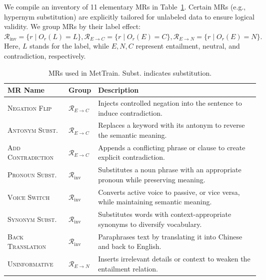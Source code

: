 \documentclass[lettersize,journal]{IEEEtran}
\begin{document}

We compile an inventory of 11 elementary MRs in Table~\ref{tab:allMRs}. Certain MRs (e.g., hypernym substitution) are explicitly tailored for unlabeled data to ensure logical validity. 
We group MRs by their label effect:
\(
\mathcal{R}_{\mathrm{inv}}=\{r \mid O_r(L)=L\}, 
\mathcal{R}_{E\rightarrow C}=\{r \mid O_r(E)=C\}, 
\mathcal{R}_{E\rightarrow N}=\{r \mid O_r(E)=N\}.
\)
Here, $L$ stands for the label, while $E,N,C$ represent entailment, neutral, and contradiction, respectively.

\begin{table}[h]
	\centering
	\footnotesize
	\caption{MRs used in MetTrain. Subst. indicates substitution.}
	\label{tab:allMRs}
	\renewcommand{\arraystretch}{0.95}
	\setlength{\tabcolsep}{3pt}
	\begin{tabularx}{\columnwidth}{>{\raggedright\arraybackslash}p{}
			>{\centering\arraybackslash}p{}
			>{\raggedright\arraybackslash}X}
		\toprule
		\textbf{MR Name} & \textbf{Group} & \textbf{Description} \\
		\midrule
		\textsc{Negation Flip} & $\mathcal{R}_{E\rightarrow C}$ & Injects controlled negation into the sentence to induce contradiction. \\
		\textsc{Antonym Subst.} & $\mathcal{R}_{E\rightarrow C}$ & Replaces a keyword with its antonym to reverse the semantic meaning. \\
		\textsc{Add Contradiction} & $\mathcal{R}_{E\rightarrow C}$ & Appends a conflicting phrase or clause to create explicit contradiction. \\
		\textsc{Pronoun Subst.} & $\mathcal{R}_{\mathrm{inv}}$ & Substitutes a noun phrase with an appropriate pronoun while preserving meaning. \\
		\textsc{Voice Switch} & $\mathcal{R}_{\mathrm{inv}}$ & Converts active voice to passive, or vice versa, while maintaining semantic meaning. \\
		\textsc{Synonym Subst.} & $\mathcal{R}_{\mathrm{inv}}$ & Substitutes words with context-appropriate synonyms to diversify vocabulary. \\
		\textsc{Back Translation} & $\mathcal{R}_{\mathrm{inv}}$ & Paraphrases text by translating it into Chinese and back to English. \\
		\textsc{Uninformative} & $\mathcal{R}_{E\rightarrow N}$ & Inserts irrelevant details or context to weaken the entailment relation. \\

\end{tabularx}
\end{table}
\end{document}
